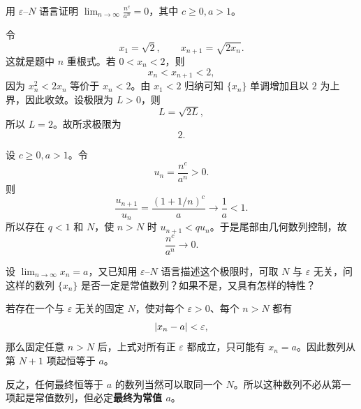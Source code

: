 \begin{xexercise}[2]
用 $\varepsilon$--$N$ 语言证明 $\displaystyle\lim_{n\to\infty}\frac{n^c}{a^n}=0$，其中 $c\ge0,a>1$。
\end{xexercise}
\begin{xsolution}
令
\[
  x_1=\sqrt2,
  \qquad
  x_{n+1}=\sqrt{2x_n}.
\]
这就是题中 $n$ 重根式。若 $0<x_n<2$，则
\[
  x_n<x_{n+1}<2,
\]
因为 $x_n^2<2x_n$ 等价于 $x_n<2$。由 $x_1<2$ 归纳可知 $\{x_n\}$ 单调增加且以 $2$ 为上界，因此收敛。设极限为 $L>0$，则
\[
  L=\sqrt{2L},
\]
所以 $L=2$。故所求极限为
\[
  \boxed{2}.
\]

设 $c\ge0,a>1$。令
\[
  u_n=\frac{n^c}{a^n}>0.
\]
则
\[
  \frac{u_{n+1}}{u_n}
  =\frac{(1+1/n)^c}{a}\to\frac1a<1.
\]
所以存在 $q<1$ 和 $N$，使 $n>N$ 时 $u_{n+1}<qu_n$。于是尾部由几何数列控制，故
\[
  \boxed{\frac{n^c}{a^n}\to0}.
\]
\end{xsolution}


\begin{xexercise}[3]
设 $\displaystyle\lim_{n\to\infty}x_n=a$，又已知用 $\varepsilon$--$N$ 语言描述这个极限时，可取 $N$ 与 $\varepsilon$ 无关，问这样的数列 $\{x_n\}$ 是否一定是常值数列？如果不是，又具有怎样的特性？
\end{xexercise}
\begin{xsolution}
若存在一个与 $\varepsilon$ 无关的固定 $N$，使对每个 $\varepsilon>0$、每个 $n>N$ 都有
\[
  \lvert x_n-a\rvert<\varepsilon,
\]
那么固定任意 $n>N$ 后，上式对所有正 $\varepsilon$ 都成立，只可能有 $x_n=a$。因此数列从第 $N+1$ 项起恒等于 $a$。

反之，任何最终恒等于 $a$ 的数列当然可以取同一个 $N$。所以这种数列不必从第一项起是常值数列，但必定\textbf{最终为常值 $a$}。
\end{xsolution}


